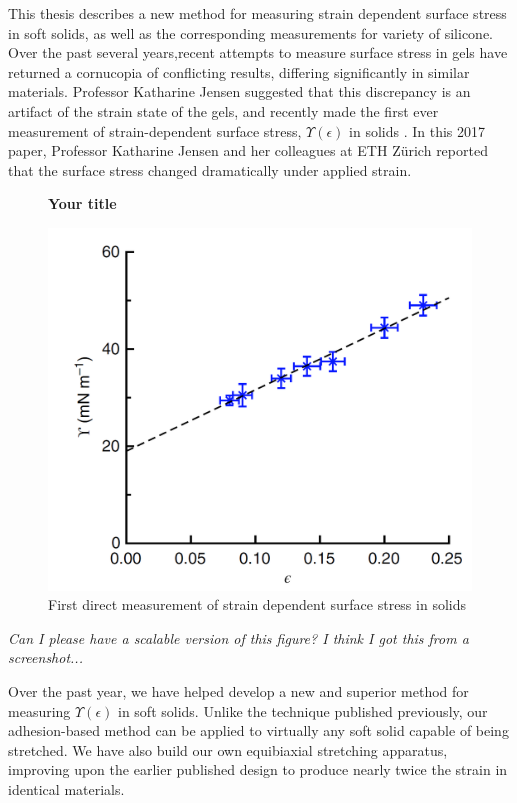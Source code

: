 This thesis describes a new method for measuring strain dependent surface stress in soft solids, as well as the corresponding measurements for variety of silicone. Over the past several years,recent attempts to measure surface stress in gels have returned a cornucopia of conflicting results, differing
significantly in similar materials. Professor Katharine Jensen suggested that this discrepancy is an artifact of the strain state of the gels, and recently made the first ever measurement of strain-dependent surface stress, $\Upsilon(\epsilon)$ in solids \cite{xu2017direct}. In this 2017 paper, Professor Katharine Jensen and her colleagues at ETH Zürich reported that the surface stress changed dramatically under applied strain. 
\begin{figure}[h!]
	\centering
	\textbf{Your title}\par\medskip
	\includegraphics[width=0.7\linewidth]{Chapters/Figures/2017natcomfig}
	\caption[Surface Stress vs. Strain in Silicone]{First direct measurement of strain dependent surface stress in solids \cite{xu2017direct}}
	\label{fig:2017natcomfig}
\end{figure}

\emph{Can I please have a scalable version of this figure? I think I got this from a screenshot...}  



Over the past year, we have helped develop a new and superior method
for measuring $\Upsilon(\epsilon)$ in soft solids. Unlike the technique published previously, our adhesion-based method can be applied to virtually any soft solid capable of being stretched. We have also build our own equibiaxial stretching apparatus, improving upon the earlier published design to produce nearly twice the strain in identical materials.

